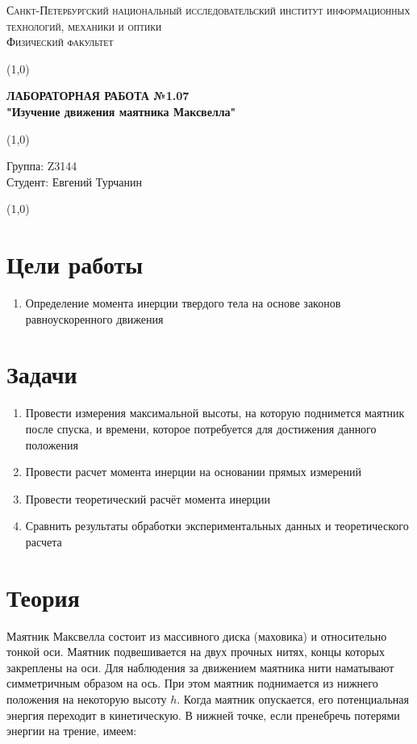 \documentclass[a4paper]{article}
\begin{document}
\begin{center}
\textsc{Санкт-Петербургский национальный исследовательский институт информационных технологий, механики и оптики\\[3mm]
Физический факультет} \\[3mm]

\end{center}
\vspace{5mm}
\line(1,0){\textwidth}
\begin{center}
\textbf{ЛАБОРАТОРНАЯ РАБОТА №1.07\\}
\textbf{"Изучение движения маятника Максвелла"}
\end{center}
\vspace{2mm}
\line(1,0){\textwidth}
\vspace{5mm}
\begin{minipage}{0.4\textwidth}
    Группа: Z3144 \\
    Студент: Евгений Турчанин\\
    \vspace{1mm}
\end{minipage}
\hfill
\vspace{1mm}
\line(1,0){\textwidth}


\section{\textbf{Цели работы}}
\begin{enumerate}
\item Определение момента инерции твердого тела на основе законов равноускоренного движения
\end{enumerate}

\section{\textbf{Задачи}}
\begin{enumerate}
\item Провести измерения максимальной высоты, на которую поднимется маятник после спуска, и времени, которое потребуется для достижения данного положения
\item Провести расчет момента инерции на основании прямых измерений
\item Провести теоретический расчёт момента инерции
\item Сравнить результаты обработки экспериментальных данных и теоретического расчета
\end{enumerate}

\section{\textbf{Теория}}
Маятник Максвелла состоит из массивного диска (маховика) и относительно тонкой оси. Маятник подвешивается на двух прочных нитях, концы которых закреплены на оси. Для наблюдения за движением маятника нити наматывают симметричным образом на ось. При этом маятник поднимается из нижнего положения на некоторую высоту $h$.
Когда маятник опускается, его потенциальная энергия переходит в кинетическую. В нижней точке, если пренебречь потерями энергии на трение, имеем:
\end{document}
